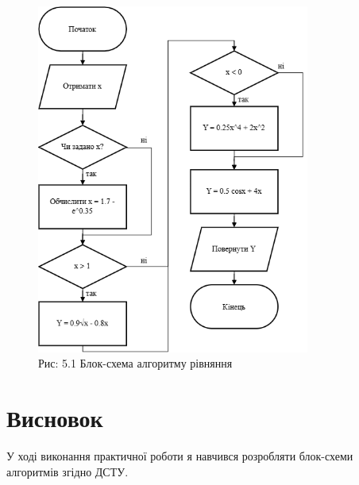 \documentclass[a4paper]{article}
\begin{document}
\begin{figure}[h]
    \centering
    \includegraphics[width=0.8\textwidth]{imgs/PW5.drawio.png}
    \caption*{Рис: 5.1 Блок-схема алгоритму рівняння}
\end{figure}

\section*{Висновок}
У ході виконання практичної роботи я навчився  розробляти блок-схеми алгоритмів згідно ДСТУ.
\end{document}
